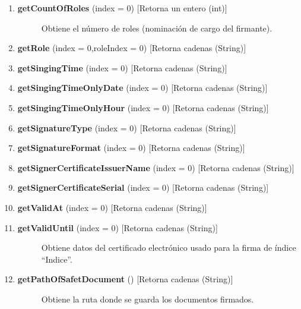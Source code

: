 \documentclass[letterpaper,11pt,spanish]{sphinxmanual}
\begin{document}
\begin{description}
\begin{enumerate}
\item {} \begin{description}
\item[{\textbf{getCountOfRoles} (index = 0) {[}Retorna un entero (int){]}}] \leavevmode
Obtiene el número de roles (nominación de cargo del firmante).

\end{description}

\item {} 
\textbf{getRole} (index = 0,roleIndex = 0) {[}Retorna cadenas (String){]}

\item {} 
\textbf{getSingingTime} (index = 0) {[}Retorna cadenas (String){]}

\item {} 
\textbf{getSingingTimeOnlyDate} (index = 0) {[}Retorna cadenas (String){]}

\item {} 
\textbf{getSingingTimeOnlyHour} (index = 0) {[}Retorna cadenas (String){]}

\item {} 
\textbf{getSignatureType} (index = 0) {[}Retorna cadenas (String){]}

\item {} 
\textbf{getSignatureFormat} (index = 0) {[}Retorna cadenas (String){]}

\item {} 
\textbf{getSignerCertificateIssuerName} (index = 0) {[}Retorna cadenas (String){]}

\item {} 
\textbf{getSignerCertificateSerial} (index = 0) {[}Retorna cadenas (String){]}

\item {} 
\textbf{getValidAt} (index = 0) {[}Retorna cadenas (String){]}

\item {} \begin{description}
\item[{\textbf{getValidUntil} (index = 0) {[}Retorna cadenas (String){]}}] \leavevmode
Obtiene datos del certificado electrónico usado para la firma de índice ``Indice''.

\end{description}

\item {} \begin{description}
\item[{\textbf{getPathOfSafetDocument} () {[}Retorna cadenas (String){]}}] \leavevmode
Obtiene la ruta donde se guarda los documentos firmados.


\end{description}
\end{enumerate}
\end{description}
\end{document}
